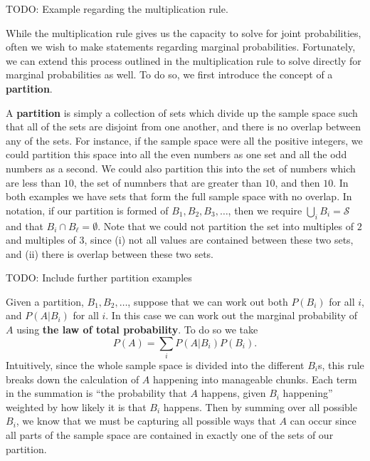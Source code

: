 \documentclass[
  letterpaper,
  DIV=11,
  numbers=noendperiod]{scrreprt}
\begin{document}
TODO: Example regarding the multiplication rule.

While the multiplication rule gives us the capacity to solve for joint
probabilities, often we wish to make statements regarding marginal
probabilities. Fortunately, we can extend this process outlined in the
multiplication rule to solve directly for marginal probabilities as
well. To do so, we first introduce the concept of a \textbf{partition}.

A \textbf{partition} is simply a collection of sets which divide up the
sample space such that all of the sets are disjoint from one another,
and there is no overlap between any of the sets. For instance, if the
sample space were all the positive integers, we could partition this
space into all the even numbers as one set and all the odd numbers as a
second. We could also partition this into the set of numbers which are
less than \(10\), the set of numnbers that are greater than \(10\), and
then \(10\). In both examples we have sets that form the full sample
space with no overlap. In notation, if our partition is formed of
\(B_1, B_2, B_3, \dots\), then we require
\(\bigcup_i B_i = \mathcal{S}\) and that
\(B_i \cap B_\ell = \emptyset\). Note that we could not partition the
set into multiples of \(2\) and multiples of \(3\), since (i) not all
values are contained between these two sets, and (ii) there is overlap
between these two sets.

TODO: Include further partition examples

Given a partition, \(B_1, B_2, \dots\), suppose that we can work out
both \(P(B_i)\) for all \(i\), and \(P(A|B_i)\) for all \(i\). In this
case we can work out the marginal probability of \(A\) using \textbf{the
law of total probability}. To do so we take
\[P(A) = \sum_i P(A|B_i)P(B_i).\] Intuitively, since the whole sample
space is divided into the different \(B_i\)s, this rule breaks down the
calculation of \(A\) happening into manageable chunks. Each term in the
summation is ``the probability that \(A\) happens, given \(B_i\)
happening'' weighted by how likely it is that \(B_i\) happens. Then by
summing over all possible \(B_i\), we know that we must be capturing all
possible ways that \(A\) can occur since all parts of the sample space
are contained in exactly one of the sets of our partition.
\end{document}
